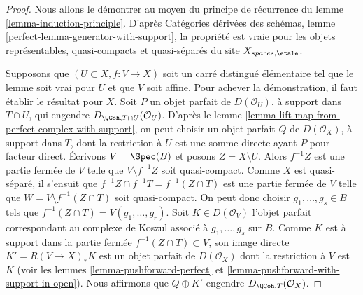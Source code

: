 \begin{proof}
Nous allons le d\'emontrer au moyen du principe de r\'ecurrence du lemme
\ref{lemma-induction-principle}. D'apr\`es Cat\'egories d\'eriv\'ees des
sch\'emas, lemme \ref{perfect-lemma-generator-with-support}, la propri\'et\'e est
vraie pour les objets repr\'esentables, quasi-compacts et quasi-s\'epar\'es du
site $X_{spaces,\etale}$.

\medskip\noindent
Supposons que $(U\subset X,f:V\to X)$ soit un carr\'e distingu\'e
\'el\'ementaire tel que le lemme soit vrai pour $U$ et que $V$ soit affine.
Pour achever la d\'emonstration, il faut \'etablir le r\'esultat pour $X$. Soit
$P$ un objet parfait de $D(\mathcal{O}_U)$, \`a support dans $T\cap U$, qui
engendre $D_{\QCoh,T\cap U}(\mathcal{O}_U)$. D'apr\`es le lemme
\ref{lemma-lift-map-from-perfect-complex-with-support}, on peut choisir un
objet parfait $Q$ de $D(\mathcal{O}_X)$, \`a support dans $T$, dont la
restriction \`a $U$ est une somme directe ayant $P$ pour facteur direct.
\'Ecrivons $V=\Spec(B)$ et posons $Z=X\setminus U$. Alors $f^{-1}Z$ est une
partie ferm\'ee de $V$ telle que $V\setminus f^{-1}Z$ soit quasi-compact.
Comme $X$ est quasi-s\'epar\'e, il s'ensuit que
$f^{-1}Z\cap f^{-1}T=f^{-1}(Z\cap T)$ est une partie ferm\'ee de $V$ telle que
$W=V\setminus f^{-1}(Z\cap T)$ soit quasi-compact. On peut donc choisir
$g_1,\ldots,g_s\in B$ tels que
$f^{-1}(Z\cap T)=V(g_1,\ldots,g_r)$. Soit $K\in D(\mathcal{O}_V)$ l'objet
parfait correspondant au complexe de Koszul associ\'e \`a
$g_1,\ldots,g_s$ sur $B$. Comme $K$ est \`a support dans la partie ferm\'ee
$f^{-1}(Z\cap T)\subset V$, son image directe $K'=R(V\to X)_*K$ est un objet
parfait de $D(\mathcal{O}_X)$ dont la restriction \`a $V$ est $K$ (voir les
lemmes \ref{lemma-pushforward-perfect} et
\ref{lemma-pushforward-with-support-in-open}). Nous affirmons que
$Q\oplus K'$ engendre $D_{\QCoh,T}(\mathcal{O}_X)$.


\end{proof}
